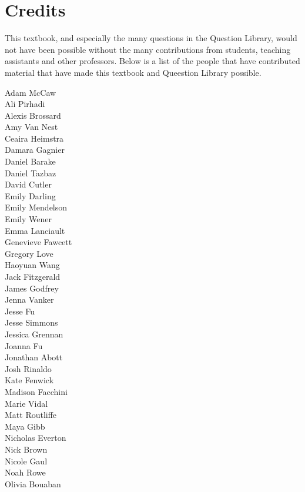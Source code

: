 \section*{Credits}
This textbook, and especially the many questions in the Question Library, would not have been possible without the many contributions from students, teaching assistants and other professors. Below is a list of the people that have contributed material that have made this textbook and Queestion Library possible. 

\begin{multicols}{3}
\begin{center}
Adam McCaw\\
Ali Pirhadi\\
Alexis Brossard\\
Amy Van Nest\\
Ceaira Heimstra\\
Damara Gagnier\\
Daniel Barake \\
Daniel Tazbaz\\
David Cutler\\
Emily Darling\\
Emily Mendelson\\
Emily Wener\\
Emma Lanciault\\
Genevieve Fawcett\\
Gregory Love\\
Haoyuan Wang\\
Jack Fitzgerald\\
James Godfrey\\
Jenna Vanker\\
\columnbreak
Jesse Fu\\
Jesse Simmons\\
Jessica Grennan\\
Joanna Fu\\
Jonathan Abott\\
Josh Rinaldo\\
Kate Fenwick\\
Madison Facchini\\
Marie Vidal\\
Matt Routliffe\\
Maya Gibb\\
Nicholas Everton\\
Nick Brown\\
Nicole Gaul\\
Noah Rowe\\
Olivia Bouaban\\

\end{center}
\end{multicols}

